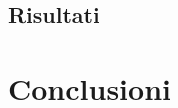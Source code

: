 \documentclass{llncs}
\begin{document}
	\subsection{Risultati}

	\section{Conclusioni}

    
\end{document}
